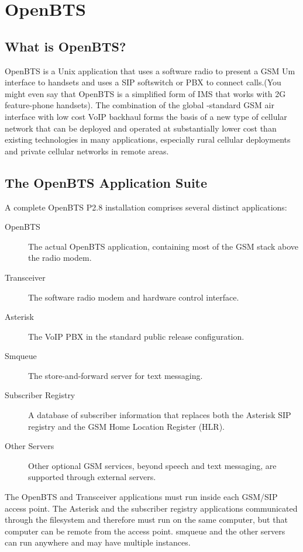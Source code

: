 \chapter{OpenBTS}

\section{What is OpenBTS?}
OpenBTS is a Unix application that uses a software radio to present a GSM Um interface to handsets and uses a SIP softswitch or PBX to connect calls.(You might even say that OpenBTS is a simplified form of IMS that works with 2G feature-phone handsets). The combination of the global -standard GSM air interface with low cost VoIP backhaul forms the basis of a new type of cellular network that can be deployed and operated at substantially lower cost than existing technologies in many applications, especially rural cellular deployments and private cellular networks in remote areas.

\section{The OpenBTS Application Suite}
A complete OpenBTS P2.8 installation comprises several distinct applications:

\begin{description}
	\item[OpenBTS] The actual OpenBTS application, containing most of the GSM stack above the radio modem.
	\item[Transceiver] The software radio modem and hardware control interface.
	\item[Asterisk] The VoIP PBX in the standard public release configuration.
	\item[Smqueue] The store-and-forward server for text messaging.
	\item[Subscriber Registry] A database of subscriber information that replaces both the Asterisk SIP registry and the GSM Home Location Register (HLR).
	\item[Other Servers] Other optional GSM services, beyond speech and text messaging, are supported through external servers.
\end{description}

The OpenBTS and Transceiver applications must run inside each GSM/SIP access point. The Asterisk and the subscriber registry applications communicated through the filesystem and therefore must run on the same computer, but that computer can be remote from the access point. smqueue and the other servers can run anywhere and may have multiple instances.

